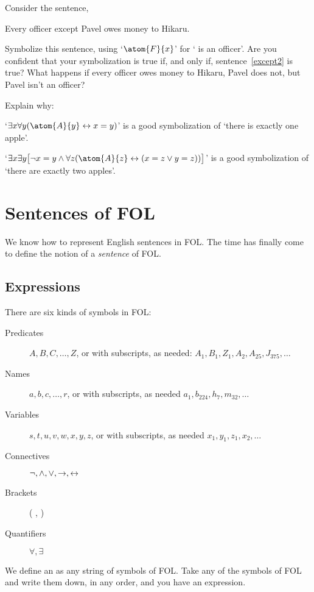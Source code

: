 \problempart 
Consider the sentence,
\begin{earg}
	\item[\ex{except2}] Every officer except Pavel owes money to Hikaru.
\end{earg}
Symbolize this sentence, using `$\atom{F}{x}$' for ` is an officer'.  Are you confident that your symbolization is true if, and only if, sentence~\ref{except2} is true?  What happens if every officer owes money to Hikaru, Pavel does not, but Pavel isn't an officer?

\problempart 
Explain why:
	\begin{ebullet}
		\item   `$\exists x \forall y(\atom{A}{y} \eiff x= y)$' is a good symbolization of `there is exactly one apple'.
		\item `$\exists x \exists y \bigl[\enot x = y \eand \forall z(\atom{A}{z} \eiff (x= z \eor y = z))\bigr]$' is a good symbolization of `there are exactly two apples'.
	\end{ebullet}		


\chapter{Sentences of FOL}\label{s:FOLSentences}
We know how to represent English sentences in FOL. The time has finally come to define the notion of a \emph{sentence} of FOL.

\section{Expressions}
There are six kinds of symbols in FOL:

\begin{description}
\item[Predicates] $A,B,C,\ldots,Z$, or 
with subscripts, as needed: $A_1, B_1,Z_1,A_2,A_{25},J_{375},\ldots$
\item[Names] $a,b,c,\ldots, r$, or
with subscripts, as needed $a_1, b_{224}, h_7, m_{32},\ldots$
\item[Variables] $s, t, u, v, w, x,y,z$, or
with subscripts, as needed $x_1, y_1, z_1, x_2,\ldots$
\item[Connectives]  $\neg,\wedge,\vee,\rightarrow,\leftrightarrow$
\item[Brackets] ( , )
\item[Quantifiers]  $\forall, \exists$
\end{description}
We define an  as any string of symbols of FOL. Take any of the symbols of FOL and write them down, in any order, and you have an expression.

